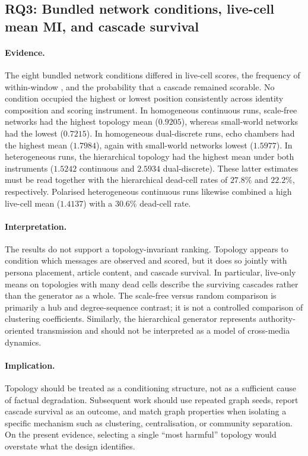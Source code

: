 \subsection{RQ3: Bundled network conditions, live-cell mean MI, and cascade survival}

\paragraph{Evidence.}
The eight bundled network conditions differed in live-cell scores, the
frequency of within-window \kstar{}, and the probability that a cascade
remained scorable. No condition occupied the highest or lowest position
consistently across identity composition and scoring instrument.  In homogeneous continuous runs,
scale-free networks had the highest topology mean ($0.9205$), whereas
small-world networks had the lowest ($0.7215$).  In homogeneous
dual-discrete runs, echo chambers had the highest mean ($1.7984$), again with
small-world networks lowest ($1.5977$).  In heterogeneous runs, the
hierarchical topology had the highest mean under both instruments ($1.5242$
continuous and $2.5934$ dual-discrete).  These latter estimates must be read
together with the hierarchical dead-cell rates of $27.8\%$ and $22.2\%$,
respectively.  Polarised heterogeneous continuous runs likewise combined a
high live-cell mean ($1.4137$) with a $30.6\%$ dead-cell rate.

\paragraph{Interpretation.}
The results do not support a topology-invariant ranking.  Topology appears to
condition which messages are observed and scored, but it does so jointly with
persona placement, article content, and cascade survival.  In particular,
live-only means on topologies with many dead cells describe the surviving
cascades rather than the generator as a whole.  The scale-free versus random
comparison is primarily a hub and degree-sequence contrast; it is not a
controlled comparison of clustering coefficients.  Similarly, the
hierarchical generator represents authority-oriented transmission and should
not be interpreted as a model of cross-media dynamics.

\paragraph{Implication.}
Topology should be treated as a conditioning structure, not as a sufficient
cause of factual degradation.  Subsequent work should use repeated graph
seeds, report cascade survival as an outcome, and match graph properties when
isolating a specific mechanism such as clustering, centralisation, or
community separation.  On the present evidence, selecting a single
\enquote{most harmful} topology would overstate what the design identifies.

